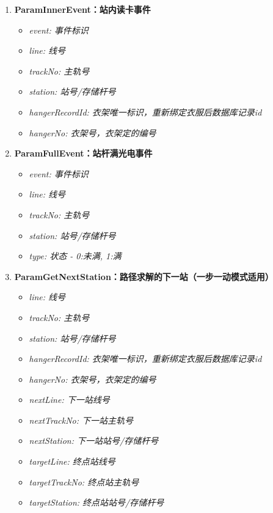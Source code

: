 \begin{enumerate}[label=\arabic*)]
\begin{itemize}
			\item \it{targetTrackNo}: 终点站主轨号
			\item \it{targetStation}: 终点站站号/存储杆号
		\end{itemize}
		\item \bf{ParamInnerEvent}：站内读卡事件
		\begin{itemize}
			\item \it{event}: 事件标识
			\item \it{line}: 线号
			\item \it{trackNo}: 主轨号
			\item \it{station}: 站号/存储杆号
			\item \it{hangerRecordId}: 衣架唯一标识，重新绑定衣服后数据库记录id
			\item \it{hangerNo}: 衣架号，衣架定的编号
		\end{itemize}
		\item \bf{ParamFullEvent}：站杆满光电事件
		\begin{itemize}
			\item \it{event}: 事件标识
			\item \it{line}: 线号
			\item \it{trackNo}: 主轨号
			\item \it{station}: 站号/存储杆号
			\item \it{type}: 状态 - 0:未满, 1:满
		\end{itemize}
		\item \bf{ParamGetNextStation}：路径求解的下一站（一步一动模式适用）\label{sec:param-getNextStation}
		\begin{itemize}
			\item \it{line}: 线号
			\item \it{trackNo}: 主轨号
			\item \it{station}: 站号/存储杆号
			\item \it{hangerRecordId}: 衣架唯一标识，重新绑定衣服后数据库记录id
			\item \it{hangerNo}: 衣架号，衣架定的编号
			\item \it{nextLine}: 下一站线号
			\item \it{nextTrackNo}: 下一站主轨号
			\item \it{nextStation}: 下一站站号/存储杆号
			\item \it{targetLine}: 终点站线号
			\item \it{targetTrackNo}: 终点站主轨号
			\item \it{targetStation}: 终点站站号/存储杆号
		\end{itemize}

\end{enumerate}

